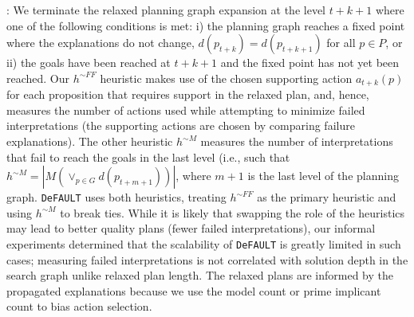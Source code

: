 \documentclass[letterpaper]{article}
\def\und#1{\noindent{\bf #1}:}
\def\FFRISKY{{\tt DeFAULT}}
\begin{document}

\und{Heuristic Computation}   We terminate the relaxed planning graph expansion
at the level $t+k+1$ where one of the following conditions is met: i) the
planning graph reaches a fixed point where the explanations do not change,
${d}(p_{t+k}) = {d}(p_{t+k+1})$ for all $p\in P$, or ii) the goals have been
reached at $t+k+1$ and the fixed point has not yet been reached. Our $h^{\sim
FF}$ heuristic makes use of the chosen supporting action ${a}_{t+k}(p)$ for each
proposition that requires support in the relaxed plan, and, hence, measures the
number of actions used while attempting to minimize failed interpretations
(the supporting actions are chosen by comparing failure explanations). The other
heuristic $h^{\sim M}$ measures the number of interpretations that fail to reach the goals in the last level (i.e., such that  $h^{\sim M} = |M(\vee_{p \in
G} {d}(p_{t+m+1}))|$, where $m+1$ is the last level of the planning graph. 
\FFRISKY{} uses both heuristics, treating  $h^{\sim FF}$ as the primary
heuristic and using $h^{\sim M}$ to break ties.  While it is likely that
swapping the role of the heuristics may lead to better quality plans (fewer
failed interpretations), our informal experiments determined that the
scalability of \FFRISKY{} is greatly limited in such cases; measuring failed
interpretations is not correlated with solution depth in the search graph unlike
relaxed plan length.  The relaxed plans are informed by the propagated
explanations because we use the model count or prime implicant count to bias
action selection.
\end{document}
